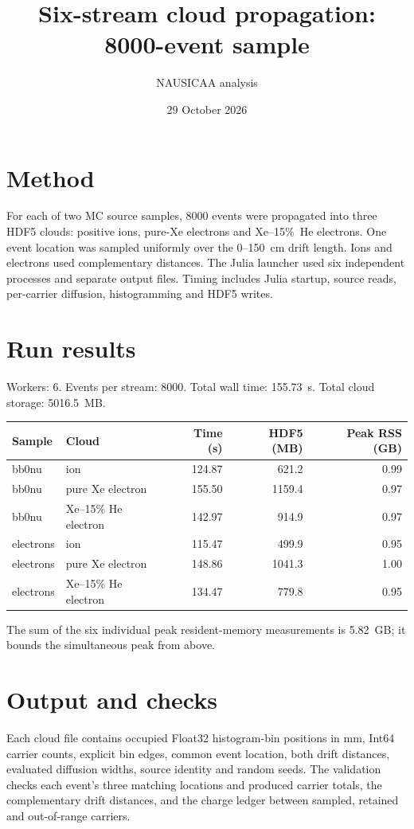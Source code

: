\documentclass{article}
\title{Six-stream cloud propagation: 8000-event sample}
\author{NAUSICAA analysis}
\date{29 October 2026}
\begin{document}
\maketitle
\section*{Method}
For each of two MC source samples, 8000 events were propagated into three
HDF5 clouds: positive ions, pure-Xe electrons and Xe--15\%~He electrons.
One event location was sampled uniformly over the 0--150~cm drift length.
Ions and electrons used complementary distances. The Julia launcher used
six independent processes and separate output files. Timing includes Julia
startup, source reads, per-carrier diffusion, histogramming and HDF5 writes.

\section*{Run results}
Workers: 6. Events per stream: 8000. Total wall time: 155.73~s. Total cloud storage: 5016.5~MB.

\begin{center}
\begin{tabular}{llrrr}
\toprule
Sample & Cloud & Time (s) & HDF5 (MB) & Peak RSS (GB) \\
\midrule
bb0nu & ion & 124.87 & 621.2 & 0.99 \\
bb0nu & pure Xe electron & 155.50 & 1159.4 & 0.97 \\
bb0nu & Xe--15\% He electron & 142.97 & 914.9 & 0.97 \\
electrons & ion & 115.47 & 499.9 & 0.95 \\
electrons & pure Xe electron & 148.86 & 1041.3 & 1.00 \\
electrons & Xe--15\% He electron & 134.47 & 779.8 & 0.95 \\
\bottomrule
\end{tabular}
\end{center}
The sum of the six individual peak resident-memory measurements is 5.82~GB; it bounds the simultaneous peak from above.

\section*{Output and checks}
Each cloud file contains occupied Float32 histogram-bin positions in mm,
Int64 carrier counts, explicit bin edges, common event location, both drift
distances, evaluated diffusion widths, source identity and random seeds.
The validation checks each event's three matching locations and produced
carrier totals, the complementary drift distances, and the charge ledger
between sampled, retained and out-of-range carriers.
\end{document}
